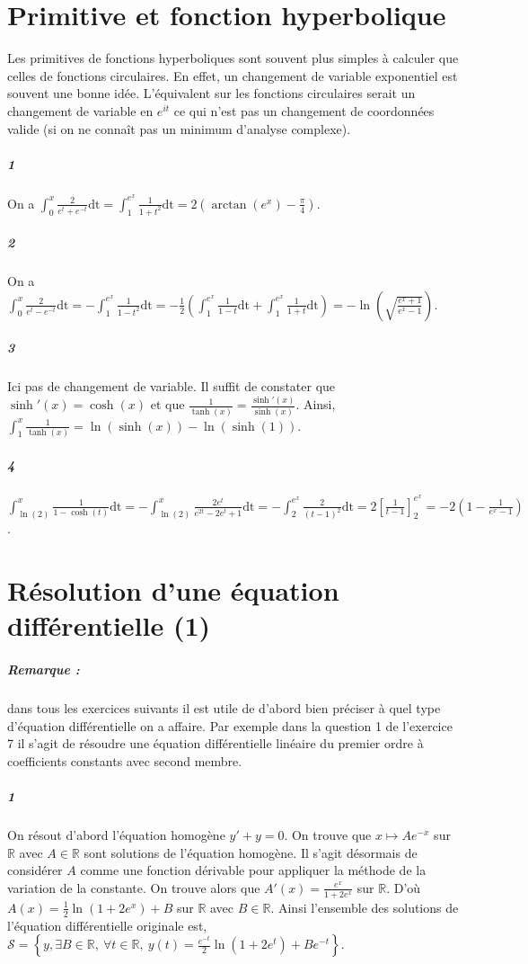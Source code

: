 \documentclass[10pt,a4paper]{article}
\begin{document}
\section{Primitive et fonction hyperbolique}
Les primitives de fonctions hyperboliques sont souvent plus simples à calculer que celles de fonctions circulaires. En effet, un changement de variable exponentiel est souvent une bonne idée. L'équivalent sur les fonctions circulaires serait un changement de variable en $e^{it}$ ce qui n'est pas un changement de coordonnées valide (si on ne connaît pas un minimum d'analyse complexe).
\subparagraph{1} On a $\int_0^x \frac{2}{e^t +e^{-t}} \text{dt} = \int_1^{e^x} \frac{1}{1+t^2} \text{dt} = 2 \left( \arctan \left(e^x \right) - \frac{\pi}{4}\right)$.
\subparagraph{2}On a $\int_0^x \frac{2}{e^t -e^{-t}} \text{dt} = -\int_1^{e^x} \frac{1}{1-t^2} \text{dt} = -\frac{1}{2} \left( \int_1^{e^x} \frac{1}{1-t} \text{dt} + \int_1^{e^x} \frac{1}{1+t} \text{dt}\right) = -\ln \left( \sqrt{\frac{e^x+1}{e^{x}-1}} \right)$.
\subparagraph{3}Ici pas de changement de variable. Il suffit de constater que  $\sinh'(x) = \cosh(x)$ et que $\frac{1}{\tanh(x)} = \frac{\sinh'(x)}{\sinh(x)}$. Ainsi, $\int_1^x \frac{1}{\tanh(x)} = \ln(\sinh(x)) - \ln(\sinh(1))$.
\subparagraph{4} $\int_{\ln(2)}^x \frac{1}{1-\cosh(t)} \text{dt} = -\int_{\ln(2)}^x \frac{2e^t}{e^{2t} -2e^t +1} \text{dt} = -\int_{2}^{e^x} \frac{2}{(t-1)^2} \text{dt} = 2 [\frac{1}{t-1}]_2^{e^x} = -2 \left( 1 - \frac{1}{e^x-1} \right)$.

\section{Résolution d'une équation différentielle (1)}
\subparagraph{Remarque :} dans tous les exercices suivants il est utile de d'abord bien préciser à quel type d'équation différentielle on a affaire. Par exemple dans la question 1 de l'exercice 7 il s'agit de résoudre une équation différentielle linéaire du premier ordre à coefficients constants avec second membre.

\subparagraph{1} On résout d'abord l'équation homogène $y' + y = 0$. On trouve que ${x \mapsto Ae^{-x}}$ sur $\mathbb{R}$ avec $A \in \mathbb{R}$ sont solutions de l'équation homogène. Il s'agit désormais de considérer $A$ comme une fonction dérivable pour appliquer la méthode de la variation de la constante. On trouve alors que $A'(x) = \frac{e^x}{1+2e^x}$ sur $\mathbb{R}$. D'où $A(x) = \frac{1}{2} \ln \left( 1 + 2e^x\right) + B$ sur $\mathbb{R}$ avec $B \in \mathbb{R}$. Ainsi l'ensemble des solutions de l'équation différentielle originale est, ${\mathcal{S} = \left\lbrace y, \exists B \in \mathbb{R}, \ \forall t \in \mathbb{R}, \ y(t) = \frac{e^{-t}}{2}\ln \left( 1 + 2e^t\right) + Be^{-t} \right\rbrace}$.
\end{document}

